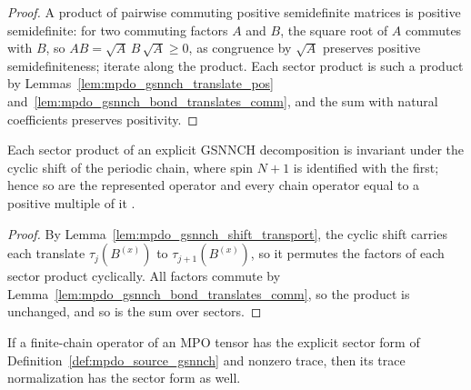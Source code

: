\begin{proof}\leanok
    A product of pairwise commuting positive semidefinite matrices is
    positive semidefinite: for two commuting factors $A$ and $B$, the square
    root of $A$ commutes with $B$, so
    $AB=\sqrt A\,B\,\sqrt A\geq 0$, as congruence by $\sqrt A$ preserves
    positive semidefiniteness; iterate along the product. Each sector product
    is such a product by Lemmas~\ref{lem:mpdo_gsnnch_translate_pos}
    and~\ref{lem:mpdo_gsnnch_bond_translates_comm}, and the sum with natural
    coefficients preserves positivity.
\end{proof}

\begin{lemma}
    \label{lem:mpdo_gsnnch_sector_sum_translation_invariant}
    \leanok
    Each sector product of an explicit GSNNCH decomposition is invariant
    under the cyclic shift of the periodic chain, where spin $N+1$ is
    identified with the first; hence so are the represented operator and
    every chain operator equal to a positive multiple of it
    \cite[lines~838--842]{Cirac2016MPDO_arXiv}.
\end{lemma}

\begin{proof}\leanok
    By Lemma~\ref{lem:mpdo_gsnnch_shift_transport},
    the cyclic shift carries each translate $\tau_j(B^{(x)})$ to
    $\tau_{j+1}(B^{(x)})$, so it permutes the factors of each sector product
    cyclically. All factors commute by
    Lemma~\ref{lem:mpdo_gsnnch_bond_translates_comm}, so the product is
    unchanged, and so is the sum over sectors.
\end{proof}

\begin{lemma}
    \label{lem:mpdo_gsnnch_form_normalized}
    \leanok
    If a finite-chain operator of an MPO tensor has the explicit sector form
    of Definition~\ref{def:mpdo_source_gsnnch} and nonzero trace, then its
    trace normalization has the sector form as well.
\end{lemma}


